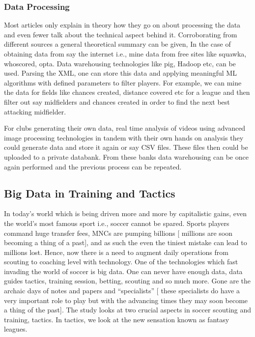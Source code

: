 \documentclass[sigconf]{acmart}
\begin{document}
\subsubsection{Data Processing}

Most articles only explain in theory how they go on about processing the data and even fewer talk about the technical aspect behind it. Corroborating from different sources \cite{Rein2016}\cite{Luca20000}\cite{Outsideoftheboot2000} a general theoretical summary can be given, In the case of obtaining data from say the internet i.e., mine data from free sites like squawka, whoscored, opta. Data warehousing technologies like pig, Hadoop etc, can be used. Parsing the XML, one can store this data and applying meaningful ML algorithms with defined parameters to filter players. For example, we can mine the data for fields like chances created, distance covered etc for a league and then filter out say midfielders and chances created in order to find the next best attacking midfielder.

For clubs generating their own data, real time analysis of videos using advanced image processing technologies in tandem with their own hands on analysis they could generate data and store it again or say CSV files. These files then could be uploaded to a private databank. From these banks data warehousing can be once again performed and the previous process can be repeated.


\subsection{Big Data in Training and Tactics}

In today’s world which is being driven more and more by capitalistic gains, even the world’s most famous sport i.e., soccer cannot be spared. Sports players command huge transfer fees, MNCs are pumping billions [ millions are soon becoming a thing of a past]\cite{cooling}, and as such the even the tiniest mistake can lead to millions lost. Hence, now there is a need to augment daily operations from scouting to coaching level with technology. One of the technologies which fast invading the world of soccer is big data. One can never have enough data, data guides tactics, training session, betting, scouting and so much more. Gone are the archaic days of notes and papers and “specialists” [ these specialists do have a very important role to play but with the advancing times they may soon become a thing of the past]. The study looks at two crucial aspects in soccer scouting and training, tactics. In tactics, we look at the new sensation known as fantasy leagues.
\end{document}

